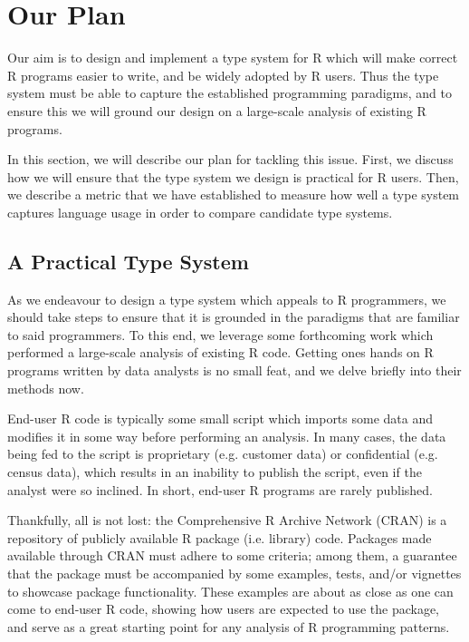 \documentclass[sigplan,10pt,review,anonymous]{acmart}\settopmatter{printfolios=true,printccs=false,printacmref=false}
\begin{document}
%
%
%
%
\section{Our Plan}
\label{sec:plan}

Our aim is to design and implement a type system for R which will make correct R programs easier to write, and be widely adopted by R users.
Thus the type system must be able to capture the established programming paradigms, and to ensure this we will ground our design on a large-scale analysis of existing R programs.

In this section, we will describe our plan for tackling this issue.
First, we discuss how we will ensure that the type system we design is practical for R users.
Then, we describe a metric that we have established to measure how well a type system captures language usage in order to compare candidate type systems.

%
%
\subsection{A Practical Type System}
\label{sec:practicalTS}

As we endeavour to design a type system which appeals to R programmers, we should take steps to ensure that it is grounded in the paradigms that are familiar to said programmers.
To this end, we leverage some forthcoming work which performed a large-scale analysis of existing R code.
Getting ones hands on R programs written by data analysts is no small feat, and we delve briefly into their methods now.

End-user R code is typically some small script which imports some data and modifies it in some way before performing an analysis.
In many cases, the data being fed to the script is proprietary (e.g. customer data) or confidential (e.g. census data), which results in an inability to publish the script, even if the analyst were so inclined.
In short, end-user R programs are rarely published.

Thankfully, all is not lost: the Comprehensive R Archive Network (CRAN) is a repository of publicly available R package (i.e. library) code.
Packages made available through CRAN must adhere to some criteria; among them, a guarantee that the package must be accompanied by some examples, tests, and/or vignettes to showcase package functionality.
These examples are about as close as one can come to end-user R code, showing how users are expected to use the package, and serve as a great starting point for any analysis of R programming patterns.
\end{document}

